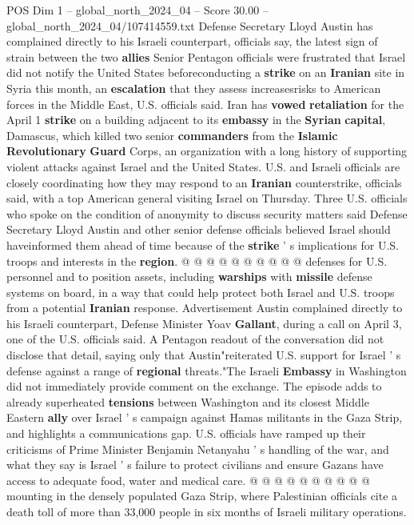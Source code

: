 \begin{textsample}{POS Dim 1 – global\_north\_2024\_04 – Score 30.00 – global\_north\_2024\_04/107414559.txt}  \label{ex:f1_pos_154}
Defense Secretary Lloyd Austin has complained directly to his Israeli counterpart, officials say, the latest sign of strain between the two \textbf{allies} Senior Pentagon officials were frustrated that Israel did not notify the United States beforeconducting a \textbf{strike} on an \textbf{Iranian} site in Syria this month, an \textbf{escalation} that they assess increasesrisks to American forces in the Middle East, U.S. officials said.
Iran has \textbf{vowed} \textbf{retaliation} for the April 1 \textbf{strike} on a building adjacent to its \textbf{embassy} in the \textbf{Syrian} \textbf{capital}, Damascus, which killed two senior \textbf{commanders} from the \textbf{Islamic} \textbf{Revolutionary} \textbf{Guard} Corps, an organization with a long history of supporting violent attacks against Israel and the United States.
U.S. and Israeli officials are closely coordinating how they may respond to an \textbf{Iranian} counterstrike, officials said, with a top American general visiting Israel on Thursday.
Three U.S. officials who spoke on the condition of anonymity to discuss security matters said Defense Secretary Lloyd Austin and other senior defense officials believed Israel should haveinformed them ahead of time because of the \textbf{strike} ' s implications for U.S. troops and interests in the \textbf{region}. @ @ @ @ @ @ @ @ @ @ defenses for U.S. personnel and to position assets, including \textbf{warships} with \textbf{missile} defense systems on board, in a way that could help protect both Israel and U.S. troops from a potential \textbf{Iranian} response.
Advertisement Austin complained directly to his Israeli counterpart, Defense Minister Yoav \textbf{Gallant}, during a call on April 3, one of the U.S. officials said.
A Pentagon readout of the conversation did not disclose that detail, saying only that Austin"reiterated U.S. support for Israel ' s defense against a range of \textbf{regional} threats."The Israeli \textbf{Embassy} in Washington did not immediately provide comment on the exchange.
The episode adds to already superheated \textbf{tensions} between Washington and its closest Middle Eastern \textbf{ally} over Israel ' s campaign against Hamas militants in the Gaza Strip, and highlights a communications gap.
U.S. officials have ramped up their criticisms of Prime Minister Benjamin Netanyahu ' s handling of the war, and what they say is Israel ' s failure to protect civilians and ensure Gazans have access to adequate food, water and medical care. @ @ @ @ @ @ @ @ @ @ mounting in the densely populated Gaza Strip, where Palestinian officials cite a death toll of more than 33,000 people in six months of Israeli military operations.

\end{textsample}
